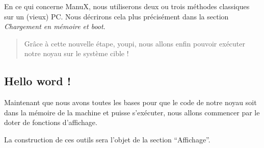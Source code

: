    En ce qui concerne ManuX, nous utiliserons deux ou trois méthodes
classiques sur un (vieux) PC. Nous décrirons cela plus précisément
dans la section {\em Chargement en mémoire et boot}.

\begin{quotation}
   Grâce à cette nouvelle étape, youpi, nous allons enfin pouvoir
exécuter notre noyau sur le système cible !
\end{quotation}

%
\subsection{Hello word !}

   Maintenant que nous avons toutes les bases pour que le code de
notre noyau soit dans la mémoire de la machine et puisse
s'exécuter, nous allons commencer par le doter de fonctions
d'affichage.

   La construction de ces outils sera l'objet de la section
   ``Affichage''.
   
